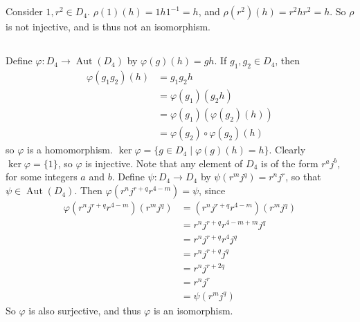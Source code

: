 \documentclass[11pt]{article}
\DeclareMathOperator{\Aut}{Aut}
\begin{document}
\subsection{} %
Consider $1,r^2\in D_4$. $\rho(1)(h)=1h1^{-1}=h$, and $\rho(r^2)(h)=r^2hr^2=h$.
So $\rho$ is not injective, and is thus not an isomorphism.


\subsection{} %
Define $\varphi:D_4\rightarrow\Aut(D_4)$ by $\varphi(g)(h)=gh$. If
$g_1,g_2\in D_4$, then
\begin{align*}
	\varphi(g_1g_2)(h)&=g_1g_2h\\
	&=\varphi(g_1)(g_2h)\\
	&=\varphi(g_1)(\varphi(g_2)(h))\\
	&=\varphi(g_2)\circ\varphi(g_2)(h)
\end{align*}
so $\varphi$ is a homomorphism.  $\ker\varphi=\{g\in D_4\mid\varphi(g)(h)=h\}$.
Clearly $\ker\varphi=\{1\}$, so $\varphi$ is injective. Note that any element
of $D_4$ is of the form $r^aj^b$, for some integers $a$ and $b$. Define
$\psi:D_4\rightarrow D_4$ by $\psi(r^mj^q)=r^nj^r$, so that $\psi\in\Aut(D_4)$.
Then $\varphi(r^nj^{r+q}r^{4-m})=\psi$, since
\begin{align*}
	\varphi(r^nj^{r+q}r^{4-m})(r^mj^q)&=(r^nj^{r+q}r^{4-m})(r^mj^q)\\
	&=r^nj^{r+q}r^{4-m+m}j^q\\
	&=r^nj^{r+q}r^4j^q\\
	&=r^nj^{r+q}j^q\\
	&=r^nj^{r+2q}\\
	&=r^nj^r\\
	&=\psi(r^mj^q)
\end{align*}
So $\varphi$ is also surjective, and thus $\varphi$ is an isomorphism.
\end{document}
